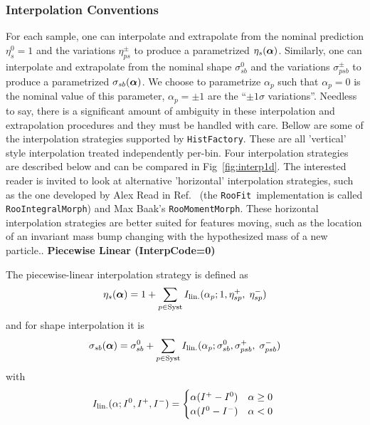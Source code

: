 \documentclass{cernrep}
\def\roofit{\texttt{RooFit}}
\def\vec#1{\ifmmode
\mathchoice{\mbox{\boldmath$\displaystyle\bf#1$}}
{\mbox{\boldmath$\textstyle\bf#1$}}
{\mbox{\boldmath$\scriptstyle\bf#1$}}
{\mbox{\boldmath$\scriptscriptstyle\bf#1$}}\else
{\mbox{\boldmath$\bf#1$}}\fi}
\begin{document}
\subsubsection{Interpolation Conventions}
\label{S:Interpolation}


For each sample, one can interpolate and extrapolate from the nominal prediction $\eta_s^0=1$ and the variations $\eta^\pm_{ps}$ to produce a parametrized $\eta_s(\vec{\alpha})$.   Similarly, one can interpolate and extrapolate from the nominal shape $\sigma_{sb}^0$ and the variations $\sigma^\pm_{psb}$ to produce a parametrized $\sigma_{sb}(\vec{\alpha})$.  We choose to parametrize $\alpha_p$ such that $\alpha_p=0$ is the nominal value of this parameter, $\alpha_p=\pm 1$ are the ``$\pm 1\sigma$ variations''.  Needless to say, there is a significant amount of ambiguity in these interpolation and extrapolation procedures and they must be handled with care.  Bellow are some of the interpolation strategies supported by \texttt{HistFactory}.  These are all  'vertical' style interpolation treated independently per-bin. Four interpolation strategies are described below and can be compared in Fig~\ref{fig:interp1d}.  The interested reader is invited to look at alternative 'horizontal' interpolation strategies,  such as the one developed by Alex Read in Ref.~\cite{Read:1999kh} (the \roofit\ implementation is called \texttt{RooIntegralMorph}) and Max Baak's \texttt{RooMomentMorph}.  These horizontal interpolation strategies are better suited for features moving, such as the location of an invariant mass bump changing with the hypothesized mass of a new particle..
{\flushleft \bf Piecewise Linear (InterpCode=0)}

The piecewise-linear interpolation strategy is defined as
\begin{equation}
\eta_s ({\boldsymbol \alpha}) = 1+\sum_{p\in\textrm{Syst}} I_{\rm lin.}(\alpha_p; 1, \eta_{sp}^+, \; \eta_{sp}^- ) 
\end{equation}
and for shape interpolation it is
\begin{equation}
\sigma_{sb} ({\boldsymbol \alpha}) = \sigma_{sb}^0 + \sum_{p\in\textrm{Syst}} I_{\rm lin.}(\alpha_p;  \sigma_{sb}^0, \sigma_{psb}^+ ,\;
\sigma_{psb}^- )  
\end{equation}
with
\begin{equation}
 I_{\rm lin.}(\alpha;  I^0, I^+,I^- ) =
 \begin{cases}
     \alpha (I^+  -  I^0) &  \text{$\alpha\ge 0$} \\
     \alpha (I^0  -I^-)  &  \text{$\alpha<0$ }
 \end{cases}
\end{equation}
\end{document}
